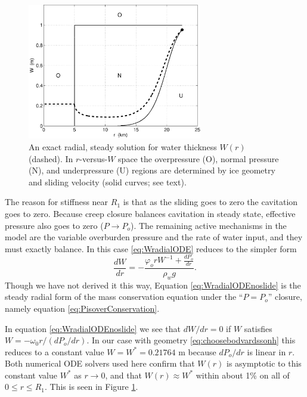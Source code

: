 \documentclass[gmd]{copernicus}   %
\begin{document}
\begin{figure}[ht]
\includegraphics[width=3.0in,keepaspectratio=true]{exact-W-plot-onu}
\caption{An exact radial, steady solution for water thickness $W(r)$ (dashed).  In $r$-versus-$W$ space the overpressure (O), normal pressure (N), and underpressure (U) regions are determined by ice geometry and sliding velocity (solid curves; see text).}
\label{fig:Wexact}
\end{figure}

The reason for stiffness near $R_1$ is that as the sliding goes to zero the cavitation goes to zero.  Because creep closure balances cavitation in steady state, effective pressure also goes to zero ($P\to P_o$).  The remaining active mechanisms in the model are the variable overburden pressure and the rate of water input, and they must exactly balance.  In this case \eqref{eq:WradialODE} reduces to the simpler form
\begin{equation}
\frac{dW}{dr} = - \frac{\varphi_o r W^{-1} + \frac{dP_o}{dr}}{\rho_w g}. \label{eq:WradialODEnoslide}
\end{equation}
Though we have not derived it this way, Equation \eqref{eq:WradialODEnoslide} is the steady radial form of the mass conservation equation under the ``$P=P_o$'' closure, namely equation \eqref{eq:PisoverConservation}.

In equation \eqref{eq:WradialODEnoslide} we see that $dW/dr=0$ if $W$ satisfies $W = - \omega_0 r / (dP_o/dr)$.  In our case with geometry \eqref{eq:choosebodvardssonh} this reduces to a constant value $W=W^*= 0.21764$ m because $dP_o/dr$ is linear in $r$.  Both numerical ODE solvers used here confirm that $W(r)$ is asymptotic to this constant value $W^*$ as $r\to 0$, and that $W(r)\approx W^*$ within about 1\% on all of $0\le r \le R_1$.  This is seen in Figure \ref{fig:Wexact}.
\end{document}
